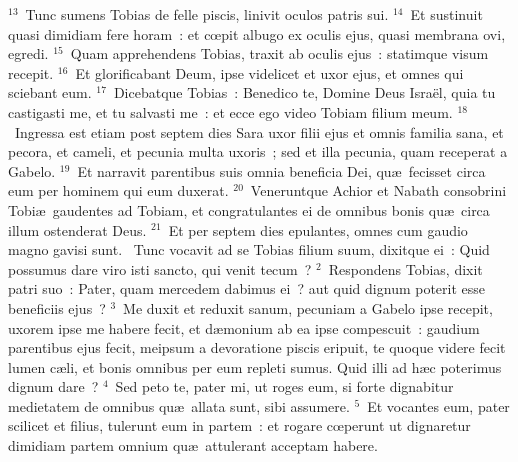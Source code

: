 ${}^{13}$~Tunc sumens Tobias de felle piscis, linivit oculos patris sui.
${}^{14}$~Et sustinuit quasi dimidiam fere horam~: et cœpit albugo ex oculis ejus, quasi membrana ovi, egredi.
${}^{15}$~Quam apprehendens Tobias, traxit ab oculis ejus~: statimque visum recepit.
${}^{16}$~Et glorificabant Deum, ipse videlicet et uxor ejus, et omnes qui sciebant eum.
${}^{17}$~Dicebatque Tobias~: Benedico te, Domine Deus Isra\"el, quia tu castigasti me, et tu salvasti me~: et ecce ego video Tobiam filium meum.
${}^{18}$~Ingressa est etiam post septem dies Sara uxor filii ejus et omnis familia sana, et pecora, et cameli, et pecunia multa uxoris~; sed et illa pecunia, quam receperat a Gabelo.
${}^{19}$~Et narravit parentibus suis omnia beneficia Dei, qu\ae\ fecisset circa eum per hominem qui eum duxerat.
${}^{20}$~Veneruntque Achior et Nabath consobrini Tobi\ae\ gaudentes ad Tobiam, et congratulantes ei de omnibus bonis qu\ae\ circa illum ostenderat Deus.
${}^{21}$~Et per septem dies epulantes, omnes cum gaudio magno gavisi sunt.
~Tunc vocavit ad se Tobias filium suum, dixitque ei~: Quid possumus dare viro isti sancto, qui venit tecum~?
${}^{2}$~Respondens Tobias, dixit patri suo~: Pater, quam mercedem dabimus ei~? aut quid dignum poterit esse beneficiis ejus~?
${}^{3}$~Me duxit et reduxit sanum, pecuniam a Gabelo ipse recepit, uxorem ipse me habere fecit, et d\ae monium ab ea ipse compescuit~: gaudium parentibus ejus fecit, meipsum a devoratione piscis eripuit, te quoque videre fecit lumen c\ae li, et bonis omnibus per eum repleti sumus. Quid illi ad h\ae c poterimus dignum dare~?
${}^{4}$~Sed peto te, pater mi, ut roges eum, si forte dignabitur medietatem de omnibus qu\ae\ allata sunt, sibi assumere.
${}^{5}$~Et vocantes eum, pater scilicet et filius, tulerunt eum in partem~: et rogare cœperunt ut dignaretur dimidiam partem omnium qu\ae\ attulerant acceptam habere.


